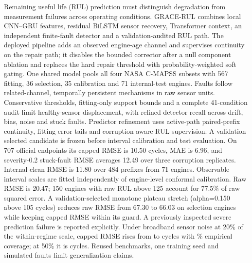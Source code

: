 Remaining useful life (RUL) prediction must distinguish degradation from measurement failures across operating conditions. GRACE-RUL combines local CNN--GRU features, residual BiLSTM sensor recovery, Transformer context, an independent finite-fault detector and a validation-audited RUL path. The deployed pipeline adds an observed engine-age channel and supervises continuity on the repair path; it disables the bounded corrector after a null component ablation and replaces the hard repair threshold with probability-weighted soft gating. One shared model pools all four NASA C-MAPSS subsets with 567 fitting, 36 selection, 35 calibration and 71 internal-test engines. Faults follow related-channel, temporally persistent mechanisms in raw sensor units. Conservative thresholds, fitting-only support bounds and a complete 41-condition audit limit healthy-sensor displacement, with refined detector recall across drift, bias, noise and stuck faults. Predictor refinement uses active-path paired-prefix continuity, fitting-error tails and corruption-aware RUL supervision. A validation-selected candidate is frozen before interval calibration and test evaluation. On 707 official endpoints its capped RMSE is 10.50 cycles, MAE is 6.96, and severity-0.2 stuck-fault RMSE averages 12.49 over three corruption replicates. Internal clean RMSE is 11.80 over 484 prefixes from 71 engines. Observable interval scales are fitted independently of engine-level conformal calibration. Raw RMSE is 20.47; 150 engines with raw RUL above 125 account for 77.5\% of raw squared error. A validation-selected monotone plateau stretch (alpha=0.150 above 105 cycles) reduces raw RMSE from 67.30 to 66.03 on selection engines while keeping capped RMSE within its guard. A previously inspected severe prediction failure is reported explicitly. Under broadband sensor noise at 20\% of the within-regime scale, capped RMSE rises from \CurrentNoiseOfficialZero{} to \CurrentNoiseOfficialTwenty{} cycles with \CurrentNoiseCoverageTwenty{}\% empirical coverage; at 50\% it is \CurrentNoiseOfficialFifty{} cycles. Reused benchmarks, one training seed and simulated faults limit generalization claims.
